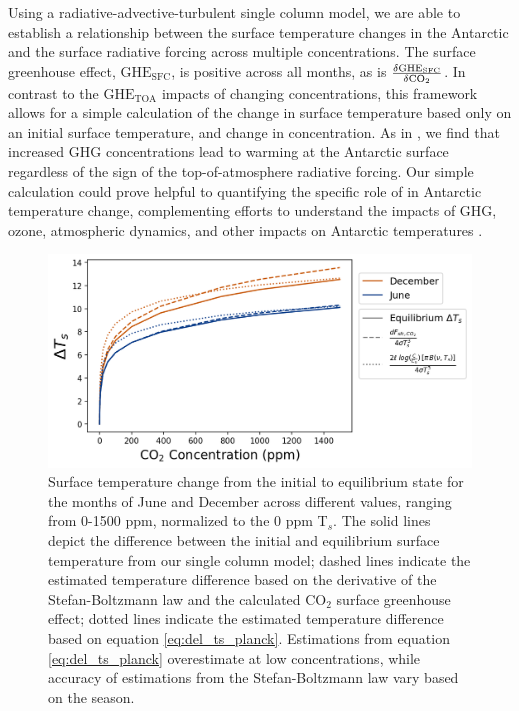 \documentclass[draft]{agujournal2019}
\begin{document}
Using a radiative-advective-turbulent single column model, we are able to establish a relationship between the surface temperature changes in the Antarctic and the surface radiative forcing across multiple  concentrations. The  surface greenhouse effect, $\text{GHE}_\text{{SFC}}$, is positive across all months, as is $\frac{\delta{\text{GHE}_\text{{SFC}}}}{\delta\ce{CO_2}}$. In contrast to the $\text{GHE}_\text{{TOA}}$ impacts of changing  concentrations, this framework allows for a simple calculation of the change in surface temperature based only on an initial surface temperature, and change in  concentration. As in , we find that increased GHG concentrations lead to warming at the Antarctic surface regardless of the sign of the top-of-atmosphere radiative forcing. Our simple calculation could prove helpful to quantifying the specific role of  in Antarctic temperature change, complementing efforts to understand the impacts of GHG, ozone, atmospheric dynamics, and other impacts on Antarctic temperatures \cite{shindell_southern_2004, thompson_signatures_2011}.

\begin{figure}[htb!]
\noindent\includegraphics[width=1\textwidth]{figures/delta_Ts.png}
\centering
\caption{Surface temperature change from the initial to equilibrium state for the months of June and December across different  values, ranging from 0-1500 ppm, normalized to the 0 ppm T$_s$. The solid lines depict the difference between the initial and equilibrium surface temperature from our single column model; dashed lines indicate the estimated temperature difference based on the derivative of the Stefan-Boltzmann law and the calculated CO$_2$ surface greenhouse effect; dotted lines indicate the estimated temperature difference based on equation \ref{eq:del_ts_planck}. Estimations from equation \ref{eq:del_ts_planck} overestimate at low  concentrations, while accuracy of estimations from the Stefan-Boltzmann law vary based on the season.}
\label{fig:delta_ts}
\end{figure}
\end{document}
